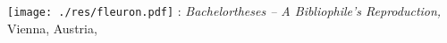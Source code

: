 
\hfill

\vfill

\noindent\texttt{[image: ./res/fleuron.pdf]} \hspace{0.5em}
\myName: \textit{Bachelortheses -- A Bibliophile's Reproduction,}
Vienna, Austria, \myTime

%
%
%
%
%

